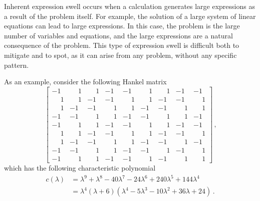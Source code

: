 Inherent expression swell occurs when a calculation generates large expressions as a result of the problem itself. For example, the solution of a large system of linear equations can lead to large expressions. In this case, the problem is the large number of variables and equations, and the large expressions are a natural consequence of the problem. This type of expression swell is difficult both to mitigate and to spot, as it can arise from any problem, without any specific pattern.
%
\begin{example}
  As an example, consider the following Hankel matrix
  \begin{equation*}
    \begin{bmatrix}
      -1 & \phantom{+}1 & \phantom{+}1 & -1 & -1 & \phantom{+}1 & \phantom{+}1 & -1 & -1 \\
      \phantom{+}1 & \phantom{+}1 & -1 & -1 & \phantom{+}1 & \phantom{+}1 & -1 & -1 & \phantom{+}1 \\
      \phantom{+}1 & -1 & -1 & \phantom{+}1 & \phantom{+}1 & -1 & -1 & \phantom{+}1 & \phantom{+}1 \\
      -1 & -1 & \phantom{+}1 & \phantom{+}1 & -1 & -1 & \phantom{+}1 & \phantom{+}1 & -1 \\
      -1 & \phantom{+}1 & \phantom{+}1 & -1 & -1 & \phantom{+}1 & \phantom{+}1 & -1 & -1 \\
      \phantom{+}1 & \phantom{+}1 & -1 & -1 & \phantom{+}1 & \phantom{+}1 & -1 & -1 & \phantom{+}1 \\
      \phantom{+}1 & -1 & -1 & \phantom{+}1 & \phantom{+}1 & -1 & -1 & \phantom{+}1 & -1 \\
      -1 & -1 & \phantom{+}1 & \phantom{+}1 & -1 & -1 & \phantom{+}1 & -1 & \phantom{+}1 \\
      -1 & \phantom{+}1 & \phantom{+}1 & -1 & -1 & \phantom{+}1 & -1 & \phantom{+}1 & \phantom{+}1
    \end{bmatrix} \, \text{,}
  \end{equation*}
  which has the following characteristic polynomial
  \begin{equation*}
    \begin{aligned}
      c(\lambda) &= \lambda^9 + \lambda^8 - 40\lambda^7 - 24\lambda^6 + 240\lambda^5+ 144\lambda^4 \\
      &= \lambda^4 (\lambda + 6)(\lambda^4 - 5\lambda^3 - 10\lambda^2 + 36\lambda + 24) \, \text{.}
    \end{aligned}
  \end{equation*}

\end{example}

